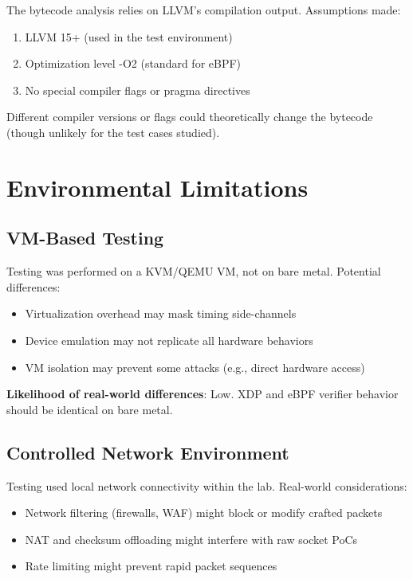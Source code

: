 The bytecode analysis relies on LLVM's compilation output. Assumptions made:
\begin{enumerate}[label=\arabic*.]
  \item LLVM 15+ (used in the test environment)
  \item Optimization level -O2 (standard for eBPF)
  \item No special compiler flags or pragma directives
\end{enumerate}

Different compiler versions or flags could theoretically change the bytecode (though unlikely for the test cases studied).

\section{Environmental Limitations}

\subsection{VM-Based Testing}

Testing was performed on a KVM/QEMU VM, not on bare metal. Potential differences:
\begin{itemize}
  \item Virtualization overhead may mask timing side-channels
  \item Device emulation may not replicate all hardware behaviors
  \item VM isolation may prevent some attacks (e.g., direct hardware access)
\end{itemize}

\textbf{Likelihood of real-world differences}: Low. XDP and eBPF verifier behavior should be identical on bare metal.

\subsection{Controlled Network Environment}

Testing used local network connectivity within the lab. Real-world considerations:
\begin{itemize}
  \item Network filtering (firewalls, WAF) might block or modify crafted packets
  \item NAT and checksum offloading might interfere with raw socket PoCs
  \item Rate limiting might prevent rapid packet sequences
\end{itemize}

